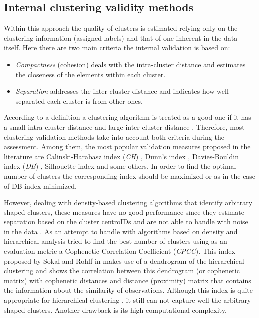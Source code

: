\documentclass[fontsize=12pt,a4paper,twoside,openany]{scrbook}
\begin{document}
\subsection{Internal clustering validity methods}
Within this approach the quality of clusters is estimated relying only on the clustering information (assigned labels) and that of one inherent in the data itself. Here there are two main criteria the internal validation is based on:
\begin{itemize}
  \item \emph{Compactness} (cohesion) deals with the intra-cluster distance and estimates the closeness of the elements within each cluster.
  \item \emph{Separation} addresses the inter-cluster distance and indicates how well-separated each cluster is from other ones.
\end{itemize}
According to a definition a clustering algorithm is treated as a good one if it has a small intra-cluster distance and large inter-cluster distance \parencite{Kim05}. Therefore, most clustering validation methods take into account both criteria during the assessment. Among them, the most popular validation measures proposed in the literature are Calinski-Harabasz index (\emph{CH}) \parencite{Calinski74}, Dunn's index \parencite{Dunn74}, Davies-Bouldin index (\emph{DB}) \parencite{DaviesB79}, Silhouette index \parencite{Rousseeuw87} and some others. In order to find the optimal number of clusters the corresponding index should be maximized or as in the case of DB index minimized.

However, dealing with density-based clustering algorithms that identify arbitrary shaped clusters, these measures have no good performance since they estimate separation based on the cluster centroIDs and are not able to handle with noise in the data \parencite{Moulavi14}. As an attempt to handle with algorithms based on density and hierarchical analysis \textcite{Saracli13} tried to find the best number of clusters using as an evaluation metric a Cophenetic Correlation Coefficient (\emph{CPCC}). This index proposed by Sokal and Rohlf in \cite*{Sokal62} makes use of a dendrogram of the hierarchical clustering and shows the correlation between this dendrogram (or cophenetic matrix) with cophenetic distances and distance (proximity) matrix that contains the information about the similarity of observations. Although this index is quite appropriate for hierarchical clustering \parencite{Palacio19}, it still can not capture well the arbitrary shaped clusters. Another drawback is its high computational complexity.
\end{document}

